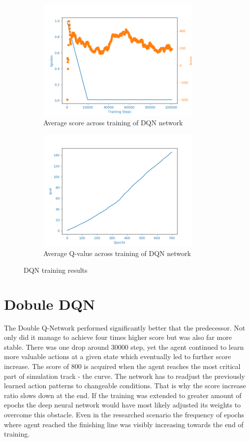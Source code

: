 \begin{figure}[htb]
\begin{subfigure}{.48\textwidth}
     \centering
    \includegraphics[width=8cm]{img/DQNAgent_WamvNavTwoSetsBuoys-v0_normal_1127_1016.png}
    \caption{Average score across training of DQN network}
    \label{fig:avg-score-dqn}   
\end{subfigure}
\begin{subfigure}{.48\textwidth}
    \centering
    \includegraphics[width=8cm]{img/DQNAgent_WamvNavTwoSetsBuoys-v0_normal_1129_1802_qval.png}
    \caption{Average Q-value across training of DQN network}
    \label{fig:avg-qval-dqn}
\end{subfigure}
\caption{DQN training results}
\label{fig:dqn-results}
\end{figure}

\newpage

\section{Dobule DQN}
\label{sec:results-double-dqn}

The Double Q-Network performed significantly better that the predecessor. Not only did it manage to achieve four times higher score but
was also far more stable. There was one drop around 30000 step, yet the agent continued to learn more valuable actions at a given state
which eventually led to further score increase. The score of 800 is acquired when the agent reaches the most critical part of
simulation track - the curve. The network has to readjust the previously learned action patterns to changeable conditions. That is why
the score increase ratio slows down at the end. If the training was extended to greater amount of epochs the deep neural network would
have most likely adjusted its weights to overcome this obstacle. Even in the researched scenario the frequency of epochs where agent reached the
finishing line was visibly increasing towards the end of training.

